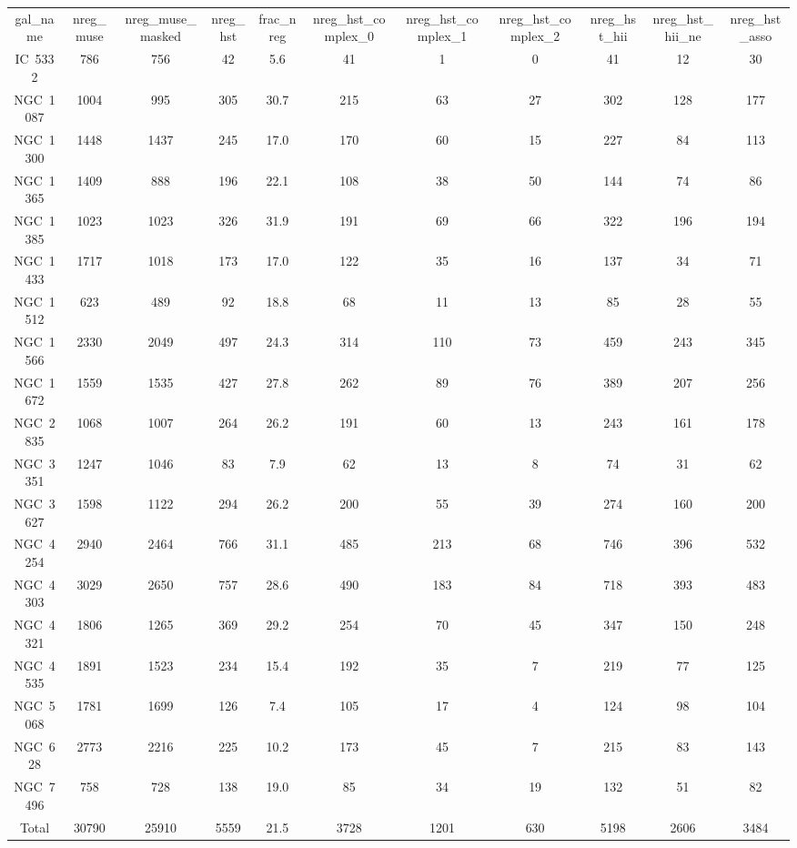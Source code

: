 \begin{table}
\begin{tabular}{ccccccccccc}
gal_name & nreg_muse & nreg_muse_masked & nreg_hst & frac_nreg & nreg_hst_complex_0 & nreg_hst_complex_1 & nreg_hst_complex_2 & nreg_hst_hii & nreg_hst_hii_ne & nreg_hst_asso \\
IC~5332 & 786 & 756 & 42 & 5.6 & 41 & 1 & 0 & 41 & 12 & 30 \\
NGC~1087 & 1004 & 995 & 305 & 30.7 & 215 & 63 & 27 & 302 & 128 & 177 \\
NGC~1300 & 1448 & 1437 & 245 & 17.0 & 170 & 60 & 15 & 227 & 84 & 113 \\
NGC~1365 & 1409 & 888 & 196 & 22.1 & 108 & 38 & 50 & 144 & 74 & 86 \\
NGC~1385 & 1023 & 1023 & 326 & 31.9 & 191 & 69 & 66 & 322 & 196 & 194 \\
NGC~1433 & 1717 & 1018 & 173 & 17.0 & 122 & 35 & 16 & 137 & 34 & 71 \\
NGC~1512 & 623 & 489 & 92 & 18.8 & 68 & 11 & 13 & 85 & 28 & 55 \\
NGC~1566 & 2330 & 2049 & 497 & 24.3 & 314 & 110 & 73 & 459 & 243 & 345 \\
NGC~1672 & 1559 & 1535 & 427 & 27.8 & 262 & 89 & 76 & 389 & 207 & 256 \\
NGC~2835 & 1068 & 1007 & 264 & 26.2 & 191 & 60 & 13 & 243 & 161 & 178 \\
NGC~3351 & 1247 & 1046 & 83 & 7.9 & 62 & 13 & 8 & 74 & 31 & 62 \\
NGC~3627 & 1598 & 1122 & 294 & 26.2 & 200 & 55 & 39 & 274 & 160 & 200 \\
NGC~4254 & 2940 & 2464 & 766 & 31.1 & 485 & 213 & 68 & 746 & 396 & 532 \\
NGC~4303 & 3029 & 2650 & 757 & 28.6 & 490 & 183 & 84 & 718 & 393 & 483 \\
NGC~4321 & 1806 & 1265 & 369 & 29.2 & 254 & 70 & 45 & 347 & 150 & 248 \\
NGC~4535 & 1891 & 1523 & 234 & 15.4 & 192 & 35 & 7 & 219 & 77 & 125 \\
NGC~5068 & 1781 & 1699 & 126 & 7.4 & 105 & 17 & 4 & 124 & 98 & 104 \\
NGC~628 & 2773 & 2216 & 225 & 10.2 & 173 & 45 & 7 & 215 & 83 & 143 \\
NGC~7496 & 758 & 728 & 138 & 19.0 & 85 & 34 & 19 & 132 & 51 & 82 \\
Total & 30790 & 25910 & 5559 & 21.5 & 3728 & 1201 & 630 & 5198 & 2606 & 3484 \\
\end{tabular}
\end{table}
